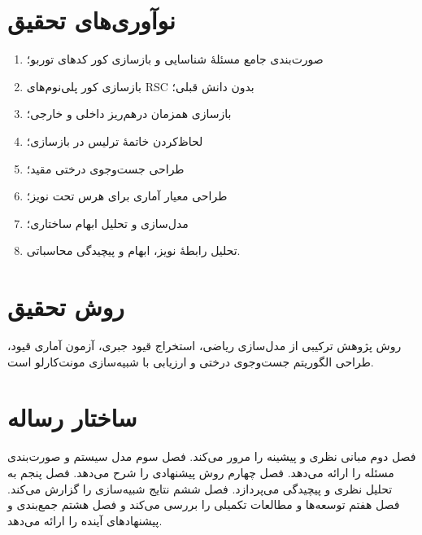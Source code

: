 \section{نوآوری‌های تحقیق}
\begin{enumerate}
	\item صورت‌بندی جامع مسئلهٔ شناسایی و بازسازی کور کدهای توربو؛
	\item بازسازی کور پلی‌نوم‌های RSC بدون دانش قبلی؛
	\item بازسازی همزمان درهم‌ریز داخلی و خارجی؛
	\item لحاظ‌کردن خاتمهٔ ترلیس در بازسازی؛
	\item طراحی جست‌وجوی درختی مقید؛
	\item طراحی معیار آماری برای هرس تحت نویز؛
	\item مدل‌سازی و تحلیل ابهام ساختاری؛
	\item تحلیل رابطهٔ نویز، ابهام و پیچیدگی محاسباتی.
\end{enumerate}

\section{روش تحقیق}
روش پژوهش ترکیبی از مدل‌سازی ریاضی، استخراج قیود جبری، آزمون آماری قیود، طراحی الگوریتم جست‌وجوی درختی و ارزیابی با شبیه‌سازی مونت‌کارلو است.

\section{ساختار رساله}
فصل دوم مبانی نظری و پیشینه را مرور می‌کند. فصل سوم مدل سیستم و صورت‌بندی مسئله را ارائه می‌دهد. فصل چهارم روش پیشنهادی را شرح می‌دهد. فصل پنجم به تحلیل نظری و پیچیدگی می‌پردازد. فصل ششم نتایج شبیه‌سازی را گزارش می‌کند. فصل هفتم توسعه‌ها و مطالعات تکمیلی را بررسی می‌کند و فصل هشتم جمع‌بندی و پیشنهادهای آینده را ارائه می‌دهد.
